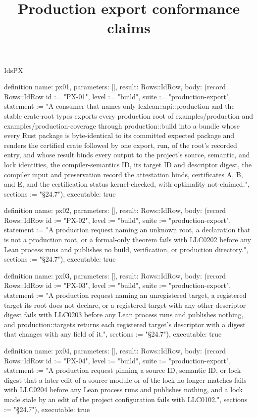 \begin{lexlean}{IdsPX}
\title{Production export conformance claims}
\begin{semanticmodule}
definition{
  name: px01,
  parameters: [],
  result: Rows::IdRow,
  body: (record Rows::IdRow {id := "PX-01", level := "build", suite := "production-export", statement := "A consumer that names only lexlean::api::production and the stable crate-root types exports every production root of examples/production and examples/production-coverage through production::build into a bundle whose every Rust package is byte-identical to its committed expected package and renders the certified crate followed by one export, run, of the root's recorded entry, and whose result binds every output to the project's source, semantic, and lock identities, the compiler-semantics ID, its target ID and descriptor digest, the compiler input and preservation record the attestation binds, certificates A, B, and E, and the certification status kernel-checked, with optimality not-claimed.", sections := "§24.7"}),
  executable: true
}

definition{
  name: px02,
  parameters: [],
  result: Rows::IdRow,
  body: (record Rows::IdRow {id := "PX-02", level := "build", suite := "production-export", statement := "A production request naming an unknown root, a declaration that is not a production root, or a formal-only theorem fails with LLC0202 before any Lean process runs and publishes no build, verification, or production directory.", sections := "§24.7"}),
  executable: true
}

definition{
  name: px03,
  parameters: [],
  result: Rows::IdRow,
  body: (record Rows::IdRow {id := "PX-03", level := "build", suite := "production-export", statement := "A production request naming an unregistered target, a registered target its root does not declare, or a registered target with any other descriptor digest fails with LLC0203 before any Lean process runs and publishes nothing, and production::targets returns each registered target's descriptor with a digest that changes with any field of it.", sections := "§24.7"}),
  executable: true
}

definition{
  name: px04,
  parameters: [],
  result: Rows::IdRow,
  body: (record Rows::IdRow {id := "PX-04", level := "build", suite := "production-export", statement := "A production request pinning a source ID, semantic ID, or lock digest that a later edit of a source module or of the lock no longer matches fails with LLC0204 before any Lean process runs and publishes nothing, and a lock made stale by an edit of the project configuration fails with LLC0102.", sections := "§24.7"}),
  executable: true
}


\end{semanticmodule}
\end{lexlean}
